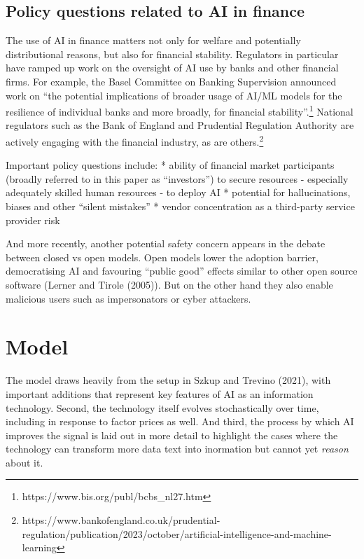 \documentclass[
]{article}
\theoremstyle{plain}
\theoremstyle{definition}
\theoremstyle{remark}
\begin{document}
\subsection{Policy questions related to AI in
finance}\label{policy-questions-related-to-ai-in-finance}

The use of AI in finance matters not only for welfare and potentially
distributional reasons, but also for financial stability. Regulators in
particular have ramped up work on the oversight of AI use by banks and
other financial firms. For example, the Basel Committee on Banking
Supervision announced work on ``the potential implications of broader
usage of AI/ML models for the resilience of individual banks and more
broadly, for financial stability''.\footnote{https://www.bis.org/publ/bcbs\_nl27.htm}
National regulators such as the Bank of England and Prudential
Regulation Authority are actively engaging with the financial industry,
as are others.\footnote{https://www.bankofengland.co.uk/prudential-regulation/publication/2023/october/artificial-intelligence-and-machine-learning}

Important policy questions include: * ability of financial market
participants (broadly referred to in this paper as ``investors'') to
secure resources - especially adequately skilled human resources - to
deploy AI * potential for hallucinations, biases and other ``silent
mistakes'' * vendor concentration as a third-party service provider risk

And more recently, another potential safety concern appears in the
debate between closed vs open models. Open models lower the adoption
barrier, democratising AI and favouring ``public good'' effects similar
to other open source software (Lerner and Tirole (2005)). But on the
other hand they also enable malicious users such as impersonators or
cyber attackers.

\section{Model}\label{model}

The model draws heavily from the setup in Szkup and Trevino (2021), with
important additions that represent key features of AI as an information
technology. Second, the technology itself evolves stochastically over
time, including in response to factor prices as well. And third, the
process by which AI improves the signal is laid out in more detail to
highlight the cases where the technology can transform more data text
into inormation but cannot yet \emph{reason} about it.
\end{document}
